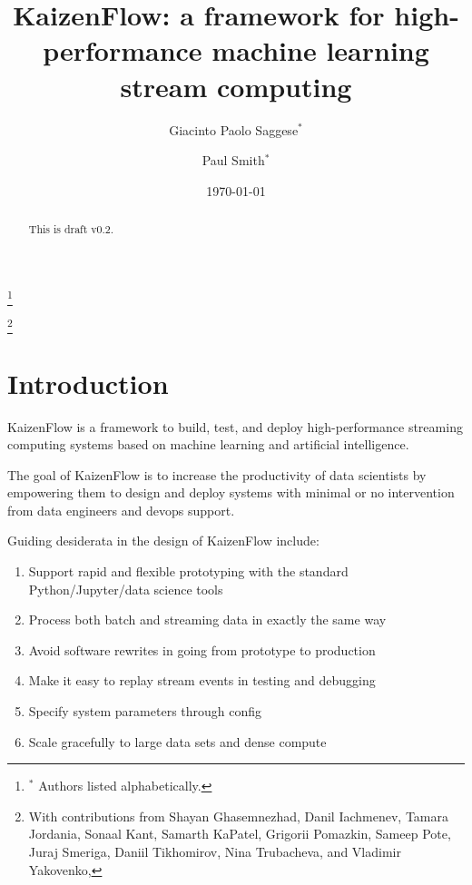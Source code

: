 \documentclass[11pt, reqno]{amsart}
\theoremstyle{definition}
\theoremstyle{remark}
\begin{document}
\title{KaizenFlow: a framework for high-performance machine learning stream computing}

\author{Giacinto Paolo Saggese$^{*}$}
\author{Paul Smith$^{*}$}
\thanks{$^{*}$ Authors listed alphabetically.}

\thanks{With contributions from
  Shayan Ghasemnezhad,
  Danil Iachmenev,
  Tamara Jordania,
  Sonaal Kant,
  Samarth KaPatel,
  Grigorii Pomazkin,
  Sameep Pote,
  Juraj Smeriga,
  Daniil Tikhomirov,
  Nina Trubacheva,
  and
  Vladimir Yakovenko,
}

\date{\today}

\begin{abstract}
  This is draft v0.2.
\end{abstract}

\maketitle

\setcounter{tocdepth}{2}
\tableofcontents

\section{Introduction}

KaizenFlow is a framework to build, test, and deploy high-performance streaming
computing systems based on machine learning and artificial intelligence.

The goal of KaizenFlow is to increase the productivity of data scientists by
empowering them to design and deploy systems with minimal or no
intervention from data engineers and devops support.

Guiding desiderata in the design of KaizenFlow include:
\begin{enumerate}
  \item Support rapid and flexible prototyping with the standard
        Python/Jupyter/data science tools
  \item Process both batch and streaming data in exactly the same way
  \item Avoid software rewrites in going from prototype to production
  \item Make it easy to replay stream events in testing and debugging
  \item Specify system parameters through config
  \item Scale gracefully to large data sets and dense compute
\end{enumerate}
\end{document}

